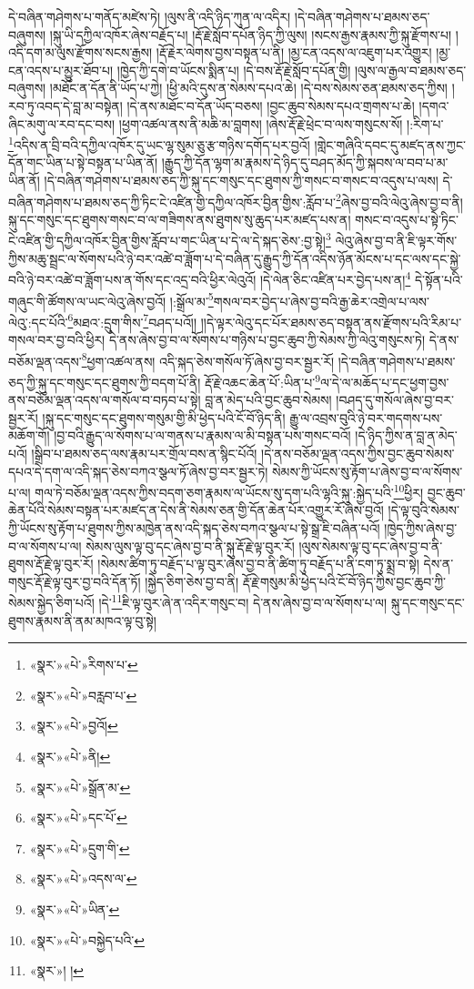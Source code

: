 དེ་བཞིན་གཤེགས་པ་གནོད་མཛེས་ཏེ། །ལུས་ནི་འདི་ཉིད་ཀུན་ལ་འདིར། །དེ་བཞིན་གཤེགས་པ་ཐམས་ཅད་བཞུགས། །སྐུ་ཡི་དཀྱིལ་འཁོར་ཞེས་བརྗོད་པ། །རྡོ་རྗེ་སློབ་དཔོན་ཉིད་ཀྱི་ལུས། །སངས་རྒྱས་རྣམས་ཀྱི་སྐུ་རྫོགས་པ། །འདི་དག་མ་ལུས་རྫོགས་སངས་རྒྱས། །རྡོ་རྗེར་ལེགས་བྱས་བསྟན་པ་ནི། །མྱ་ངན་འདས་ལ་འཇུག་པར་འགྱུར། །མྱ་ངན་འདས་པ་མྱུར་ཐོབ་པ། །ཁྱེད་ཀྱི་དགེ་བ་ཡོངས་སྨིན་པ། །དེ་བས་རྡོ་རྗེ་སློབ་དཔོན་གྱི། །ལུས་ལ་རྒྱལ་བ་ཐམས་ཅད་བཞུགས། །མཐོང་ན་དོན་ནི་ཡོད་པ་ཀྱེ། །ཕྱི་མའི་དུས་ན་སེམས་དཔའ་ཆེ། །དེ་བས་སེམས་ཅན་ཐམས་ཅད་ཀྱིས། །རབ་ཏུ་འབད་དེ་བླ་མ་བསྟེན། །དེ་ནས་མཐོང་བ་དོན་ཡོད་བཅས། །བྱང་ཆུབ་སེམས་དཔའ་གྲགས་པ་ཆེ། །དགའ་ཞིང་མགུ་ལ་རབ་དང་བས། །ཕྱག་འཚལ་ནས་ནི་མཆི་མ་བླགས། །ཞེས་རྡོ་རྗེ་ཕྲེང་བ་ལས་གསུངས་སོ། །:རིག་པ་\footnote{«སྣར་»«པེ་»རིགས་པ་}འདིས་ན་བྲི་བའི་དཀྱིལ་འཁོར་དུ་ཡང་ལྷ་སུམ་ཅུ་རྩ་གཉིས་དགོད་པར་བྱའོ། །གླེང་གཞིའི་དབང་དུ་མཛད་ནས་ཀྱང་དོན་གང་ཡིན་པ་སྟེ་བསྟན་པ་ཡིན་ནོ། །རྒྱུད་ཀྱི་དོན་ལྷག་མ་རྣམས་དེ་ཉིད་དུ་བཤད་མོད་ཀྱི་སྐབས་ལ་བབ་པ་མ་ཡིན་ནོ། །དེ་བཞིན་གཤེགས་པ་ཐམས་ཅད་ཀྱི་སྐུ་དང་གསུང་དང་ཐུགས་ཀྱི་གསང་བ་གསང་བ་འདུས་པ་ལས། དེ་བཞིན་གཤེགས་པ་ཐམས་ཅད་ཀྱི་ཏིང་ངེ་འཛིན་གྱི་དཀྱིལ་འཁོར་བྱིན་གྱིས་:རློབ་པ་\footnote{«སྣར་»«པེ་»བརླབ་པ་}ཞེས་བྱ་བའི་ལེའུ་ཞེས་བྱ་བ་ནི། སྐུ་དང་གསུང་དང་ཐུགས་གསང་བ་ལ་གཟིགས་ནས་ཐུགས་སུ་ཆུད་པར་མཛད་པས་ན། གསང་བ་འདུས་པ་སྟེ་ཏིང་ངེ་འཛིན་གྱི་དཀྱིལ་འཁོར་བྱིན་གྱིས་རློབ་པ་གང་ཡིན་པ་དེ་ལ་དེ་སྐད་ཅེས་:བྱ་སྟེ།\footnote{«སྣར་»«པེ་»བྱའོ།} ལེའུ་ཞེས་བྱ་བ་ནི་ཇི་ལྟར་གོས་ཀྱིས་མཆུ་སྦྲང་ལ་སོགས་པའི་ཉེ་བར་འཚེ་བ་ཟློག་པ་དེ་བཞིན་དུ་རྒྱུད་ཀྱི་དོན་འདིས་ཉོན་མོངས་པ་དང་ལས་དང་སྐྱེ་བའི་ཉེ་བར་འཚེ་བ་ཟློག་པས་ན་གོས་དང་འདྲ་བའི་ཕྱིར་ལེའུའོ། །དེ་ལེན་ཅིང་འཛིན་པར་བྱེད་པས་ན།\footnote{«སྣར་»«པེ་»ནི།} དེ་སྟོན་པའི་གཞུང་གི་ཚོགས་ལ་ཡང་ལེའུ་ཞེས་བྱའོ། །:སྒྲོལ་མ་\footnote{«སྣར་»«པེ་»སྒྲོན་མ་}གསལ་བར་བྱེད་པ་ཞེས་བྱ་བའི་རྒྱ་ཆེར་འགྲེལ་པ་ལས་ལེའུ་:དང་པོའི་\footnote{«སྣར་»«པེ་»དང་པོ་}མཐའ་:དྲུག་གིས་\footnote{«སྣར་»«པེ་»དྲུག་གི་}བཤད་པའོ།། །།དེ་ལྟར་ལེའུ་དང་པོར་ཐམས་ཅད་བསྟན་ནས་རྫོགས་པའི་རིམ་པ་གསལ་བར་བྱ་བའི་ཕྱིར། དེ་ནས་ཞེས་བྱ་བ་ལ་སོགས་པ་གཉིས་པ་བྱང་ཆུབ་ཀྱི་སེམས་ཀྱི་ལེའུ་གསུངས་ཏེ། དེ་ནས་བཅོམ་ལྡན་འདས་\footnote{«སྣར་»«པེ་»འདས་ལ་}ཕྱག་འཚལ་ནས། འདི་སྐད་ཅེས་གསོལ་ཏོ་ཞེས་བྱ་བར་སྦྱར་རོ། །དེ་བཞིན་གཤེགས་པ་ཐམས་ཅད་ཀྱི་སྐུ་དང་གསུང་དང་ཐུགས་ཀྱི་བདག་པོ་ནི། རྡོ་རྗེ་འཆང་ཆེན་པོ་:ཡིན་པ་\footnote{«སྣར་»«པེ་»ཡིན་}ལ་དེ་ལ་མཆོད་པ་དང་ཕྱག་བྱས་ནས་བཅོམ་ལྡན་འདས་ལ་གསོལ་བ་བཏབ་པ་སྟེ། བླ་ན་མེད་པའི་བྱང་ཆུབ་སེམས། །བཤད་དུ་གསོལ་ཞེས་བྱ་བར་སྦྱར་རོ། །སྐུ་དང་གསུང་དང་ཐུགས་གསུམ་གྱི་མི་ཕྱེད་པའི་ངོ་བོ་ཉིད་ནི། རྒྱུ་ལ་འབྲས་བུའི་ཉེ་བར་གདགས་པས་མཆོག་གོ། །བྱ་བའི་རྒྱུད་ལ་སོགས་པ་ལ་གནས་པ་རྣམས་ལ་མི་བསྟན་པས་གསང་བའོ། །དེ་ཉིད་ཀྱིས་ན་བླ་ན་མེད་པའོ། །སྒྲིབ་པ་ཐམས་ཅད་ལས་རྣམ་པར་གྲོལ་བས་ན་སྙིང་པོའོ། །དེ་ནས་བཅོམ་ལྡན་འདས་ཀྱིས་བྱང་ཆུབ་སེམས་དཔའ་དེ་དག་ལ་འདི་སྐད་ཅེས་བཀའ་སྩལ་ཏོ་ཞེས་བྱ་བར་སྦྱར་ཏེ། སེམས་ཀྱི་ཡོངས་སུ་རྟོག་པ་ཞེས་བྱ་བ་ལ་སོགས་པ་ལ། གལ་ཏེ་བཅོམ་ལྡན་འདས་ཀྱིས་བདག་ཅག་རྣམས་ལ་ཡོངས་སུ་དག་པའི་ལྷའི་སྐུ་:སྐྱེད་པའི་\footnote{«སྣར་»«པེ་»བསྐྱེད་པའི་}ཕྱིར། བྱང་ཆུབ་ཆེན་པོའི་སེམས་བསྟན་པར་མཛད་ན་དེས་ནི་སེམས་ཅན་གྱི་དོན་ཆེན་པོར་འགྱུར་རོ་ཞེས་བྱའོ། །དེ་ལྟ་བུའི་སེམས་ཀྱི་ཡོངས་སུ་རྟོག་པ་ཐུགས་ཀྱིས་མཁྱེན་ནས་འདི་སྐད་ཅེས་བཀའ་སྩལ་པ་སྟེ་སྒྲ་ཇི་བཞིན་པའོ། །ཁྱེད་ཀྱིས་ཞེས་བྱ་བ་ལ་སོགས་པ་ལ། སེམས་ལུས་ལྟ་བུ་དང་ཞེས་བྱ་བ་ནི་སྐུ་རྡོ་རྗེ་ལྟ་བུར་རོ། །ལུས་སེམས་ལྟ་བུ་དང་ཞེས་བྱ་བ་ནི་ཐུགས་རྡོ་རྗེ་ལྟ་བུར་རོ། །སེམས་ཚིག་ཏུ་བརྗོད་པ་ལྟ་བུར་ཞེས་བྱ་བ་ནི་ཚིག་ཏུ་བརྗོད་པ་ནི་ངག་ཏུ་སྨྲ་བ་སྟེ། དེས་ན་གསུང་རྡོ་རྗེ་ལྟ་བུར་བྱ་བའི་དོན་ཏོ། །སྐྱེད་ཅིག་ཅེས་བྱ་བ་ནི། རྡོ་རྗེ་གསུམ་མི་ཕྱེད་པའི་ངོ་བོ་ཉིད་ཀྱིས་བྱང་ཆུབ་ཀྱི་སེམས་སྐྱེད་ཅིག་པའོ། །དེ་\footnote{«སྣར་»། །}ཇི་ལྟ་བུར་ཞེ་ན་འདིར་གསུང་བ། དེ་ནས་ཞེས་བྱ་བ་ལ་སོགས་པ་ལ། སྐུ་དང་གསུང་དང་ཐུགས་རྣམས་ནི་ནམ་མཁའ་ལྟ་བུ་སྟེ། 